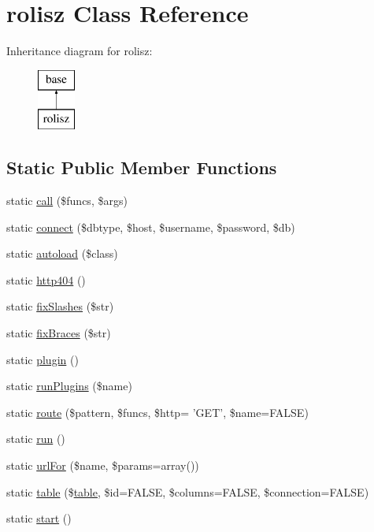 \hypertarget{classrolisz}{
\section{rolisz Class Reference}
\label{classrolisz}
}
Inheritance diagram for rolisz:\begin{figure}[H]
\begin{center}
\leavevmode
\includegraphics[height=2.000000cm]{classrolisz}
\end{center}
\end{figure}
\subsection*{Static Public Member Functions}
\begin{DoxyCompactItemize}
\item 
static \hyperlink{classrolisz_af732c33c326c863efe6dd2cccb21a9a5}{call} (\$funcs, \$args)
\item 
static \hyperlink{classrolisz_a7cee6d5c562bcb595bc9d826910d248d}{connect} (\$dbtype, \$host, \$username, \$password, \$db)
\item 
static \hyperlink{classrolisz_ab4c022bf9d3474583030f31894865182}{autoload} (\$class)
\item 
static \hyperlink{classrolisz_a6fdc4c9fc517c619d860c7e91d17b02d}{http404} ()
\item 
static \hyperlink{classrolisz_a13d0c0500b75a5bdd849a4a55ba8e2b1}{fixSlashes} (\$str)
\item 
static \hyperlink{classrolisz_ab8e0e9e5ffd59108f38efefe79511c5b}{fixBraces} (\$str)
\item 
static \hyperlink{classrolisz_a03afea9d9791d58f53a20d8f2dba4916}{plugin} ()
\item 
static \hyperlink{classrolisz_a8dd32bd8570aaba99ee7b4e34e5f17f9}{runPlugins} (\$name)
\item 
static \hyperlink{classrolisz_aafd29366ef6399da1dd079fc131d8858}{route} (\$pattern, \$funcs, \$http= 'GET', \$name=FALSE)
\item 
static \hyperlink{classrolisz_ad3a572002fd350672b531756f7306e8f}{run} ()
\item 
static \hyperlink{classrolisz_a2c24b81993e81c6401edd6c4caff0336}{urlFor} (\$name, \$params=array())
\item 
static \hyperlink{classrolisz_ac871964dd21bf398baa7f61ecea0b895}{table} (\$\hyperlink{classtable}{table}, \$id=FALSE, \$columns=FALSE, \$connection=FALSE)
\item 
static \hyperlink{classrolisz_a146085d0f3a9d17bdcd7f3d4081d8c0d}{start} ()
\end{DoxyCompactItemize}


